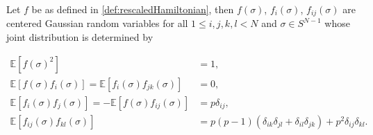 \begin{lemma}[Covariances of $f$]\label{thm:covarianceStructure}
	Let $f$ be as defined in \ref{def:rescaledHamiltonian}, then $f(\sigma)$, $f_i(\sigma)$, $f_{ij}(\sigma)$ are centered Gaussian random variables for all $1\leq i,j,k,l<N$ and $\sigma\in S^{N-1}$ whose joint distribution is determined by
	
	\begin{align}\label{eq:covariancesoff}
		\mathbb E[f(\sigma)^2]&=1,\nonumber\\
		\mathbb E[f(\sigma)f_i(\sigma)]=\mathbb E[f_i(\sigma)f_{jk}(\sigma)]&=0,\nonumber\\
		\mathbb E[f_i(\sigma)f_j(\sigma)]=-\mathbb E[f(\sigma)f_{ij}(\sigma)] &= p\delta_{ij},\nonumber\\
		\mathbb E[f_{ij}(\sigma)f_{kl}(\sigma)] &= p(p-1)(\delta_{ik}\delta_{jl}+\delta_{il}\delta_{jk})+p^2\delta_{ij}\delta_{kl}.
	\end{align}
\end{lemma}

